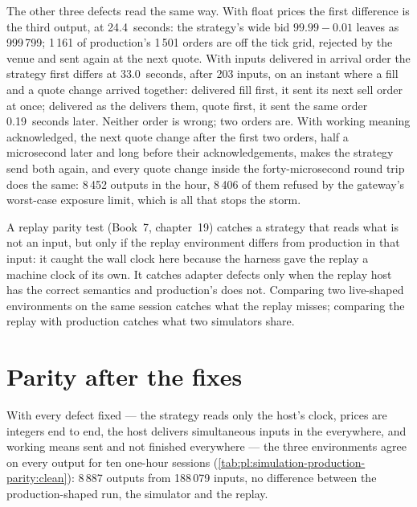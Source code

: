 The other three defects read the same way. With float prices the first difference is the third output, at 24.4~seconds: the strategy's wide
bid $99.99 - 0.01$ leaves as 999\,799; 1\,161 of production's 1\,501 orders are off the tick grid, rejected by the venue and sent again at the
next quote. With inputs delivered in arrival order the strategy first differs at 33.0~seconds, after 203 inputs, on an instant where a fill
and a quote change arrived together: delivered fill first, it sent its next sell order at once; delivered as the  delivers them,
quote first, it sent the same order 0.19~seconds later. Neither order is wrong; two orders are. With working meaning acknowledged, the next
quote change after the first two orders, half a microsecond later and long before their acknowledgements, makes the strategy send both
again, and every quote change inside the forty-microsecond round trip does the same: 8\,452 outputs in the hour, 8\,406 of them refused by
the gateway's worst-case exposure limit, which is all that stops the storm.

\begin{remark}\label{rem:pl:simulation-production-parity:replay}
A replay parity test (Book~7, chapter~19) catches a strategy that reads what is not an input, but only if the replay environment differs from
production in that input: it caught the wall clock here because the harness gave the replay a machine clock of its own. It catches adapter
defects only when the replay host has the correct semantics and production's does not. Comparing two live-shaped environments on the same
session catches what the replay misses; comparing the replay with production catches what two simulators share.
\end{remark}

\section{Parity after the fixes}

With every defect fixed --- the strategy reads only the host's clock, prices are integers end to end, the host delivers simultaneous inputs
in the  everywhere, and working means sent and not finished everywhere --- the three environments agree on every output for ten
one-hour sessions (\cref{tab:pl:simulation-production-parity:clean}): 8\,887 outputs from 188\,079 inputs, no difference between the
production-shaped run, the simulator and the replay.

